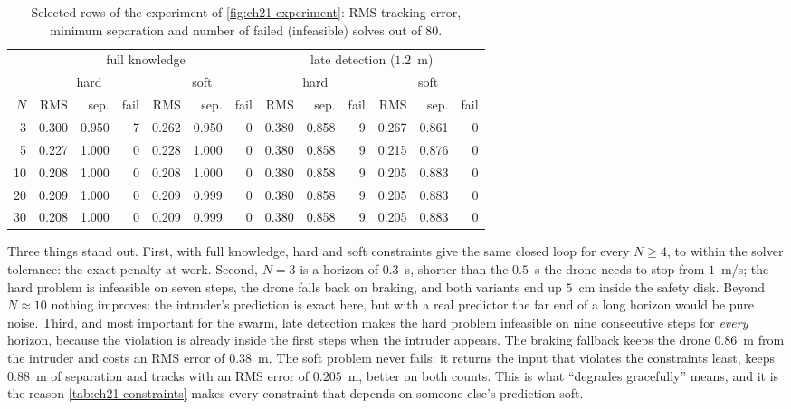 \begin{table}[tb]
\centering\small
\caption{Selected rows of the experiment of \cref{fig:ch21-experiment}: RMS
tracking error, minimum separation and number of failed (infeasible) solves
out of $80$.}
\label{tab:ch21-experiment}
\begin{tabular}{@{}rrrrrrrrrrrrr@{}}
\toprule
& \multicolumn{6}{c}{full knowledge} & \multicolumn{6}{c}{late detection ($1.2$~m)}\\
\cmidrule(lr){2-7}\cmidrule(lr){8-13}
& \multicolumn{3}{c}{hard} & \multicolumn{3}{c}{soft} & \multicolumn{3}{c}{hard} & \multicolumn{3}{c}{soft}\\
\cmidrule(lr){2-4}\cmidrule(lr){5-7}\cmidrule(lr){8-10}\cmidrule(lr){11-13}
$N$ & RMS & sep. & fail & RMS & sep. & fail & RMS & sep. & fail & RMS & sep. & fail\\
\midrule
3  & 0.300 & 0.950 & 7 & 0.262 & 0.950 & 0 & 0.380 & 0.858 & 9 & 0.267 & 0.861 & 0\\
5  & 0.227 & 1.000 & 0 & 0.228 & 1.000 & 0 & 0.380 & 0.858 & 9 & 0.215 & 0.876 & 0\\
10 & 0.208 & 1.000 & 0 & 0.208 & 1.000 & 0 & 0.380 & 0.858 & 9 & 0.205 & 0.883 & 0\\
20 & 0.209 & 1.000 & 0 & 0.209 & 0.999 & 0 & 0.380 & 0.858 & 9 & 0.205 & 0.883 & 0\\
30 & 0.208 & 1.000 & 0 & 0.209 & 0.999 & 0 & 0.380 & 0.858 & 9 & 0.205 & 0.883 & 0\\
\bottomrule
\end{tabular}
\end{table}

Three things stand out. First, with full knowledge, hard and soft constraints
give the same closed loop for every $N\ge4$, to within the solver tolerance:
the exact penalty at work. Second, $N=3$ is a horizon of $0.3$~s, shorter
than the $0.5$~s the drone needs to stop from $1$~m/s; the hard problem is
infeasible on seven steps, the drone falls back on braking, and both variants
end up $5$~cm inside the safety disk. Beyond $N\approx10$ nothing improves:
the intruder's prediction is exact here, but with a real predictor the far
end of a long horizon would be pure noise. Third, and most important for the
swarm, late detection makes the hard problem infeasible on nine consecutive
steps for \emph{every} horizon, because the violation is already inside the
first steps when the intruder appears. The braking fallback keeps the drone
$0.86$~m from the intruder and costs an RMS error of $0.38$~m. The soft
problem never fails: it returns the input that violates the constraints least,
keeps $0.88$~m of separation and tracks with an RMS error of $0.205$~m,
better on both counts. This is what ``degrades gracefully'' means, and it is
the reason \cref{tab:ch21-constraints} makes every constraint that depends on
someone else's prediction soft.

